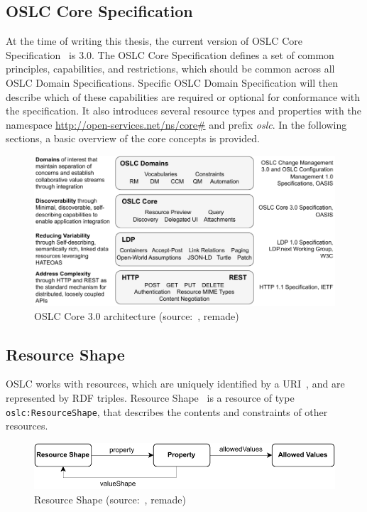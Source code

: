 \subsection{OSLC Core Specification}
\label{sec:oslc_core_specification}
At the time of writing this thesis, the current version of OSLC Core Specification \cite{oslc_core_specification} is 3.0. The OSLC Core Specification defines a set of common principles, capabilities, and restrictions, which should be common across all OSLC Domain Specifications. Specific OSLC Domain Specification will then describe which of these capabilities are required or optional for conformance with the specification. It also introduces several resource types and properties with the namespace \url{http://open-services.net/ns/core\#} and prefix \emph{oslc}. In the following sections, a basic overview of the core concepts is provided.

\begin{figure}[hbt]
  \centering
  \includegraphics[width= \linewidth]{figures/OSLC-core.pdf}
  \caption{OSLC Core 3.0 architecture (source: \cite{oslc_core_specification}, remade)}
  \label{fig:oslc_core_architecture}
\end{figure}

\subsection*{Resource Shape}
OSLC works with resources, which are uniquely identified by a URI \cite{uri_rfc}, and are represented by RDF triples. Resource Shape \cite{oslc_core_resource_shape} is a resource of type \texttt{oslc:ResourceShape}, that describes the contents and constraints of other resources.

\begin{figure}[hbt]
  \centering
  \includegraphics[width=.8 \linewidth]{figures/resource-shape.pdf}
  \caption{Resource Shape (source: \cite{oslc_core_resource_shape}, remade)}
  \label{fig:resource_shape}
\end{figure}

